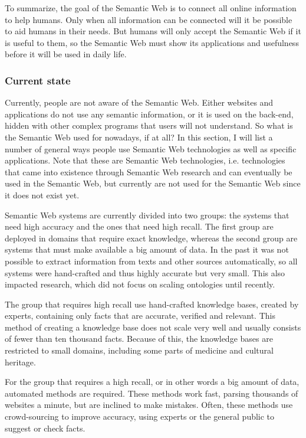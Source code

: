 \documentclass{article}
\begin{document}
 To summarize, the goal of the Semantic Web is to connect all online information to help humans. Only when all information can be connected will it be possible to aid humans in their needs. But humans will only accept the Semantic Web if it is useful to them, so the Semantic Web must show its applications and usefulness before it will be used in daily life.
 \subsubsection{Current state} %
 Currently, people are not aware of the Semantic Web. Either websites and applications do not use any semantic information, or it is used on the back-end, hidden with other complex programs that users will not understand. So what is the Semantic Web used for nowadays, if at all? In this section, I will list a number of general ways people use Semantic Web technologies as well as specific applications. Note that these are Semantic Web technologies, i.e. technologies that came into existence through Semantic Web research and can eventually be used in the Semantic Web, but currently are not used for the Semantic Web since it does not exist yet.
 
 Semantic Web systems are currently divided into two groups: the systems that need high accuracy and the ones that need high recall. The first group are deployed in domains that require exact knowledge, whereas the second group are systems that must make available a big amount of data. In the past it was not possible to extract information from texts and other sources automatically, so all systems were hand-crafted and thus highly accurate but very small. This also impacted research, which did not focus on scaling ontologies until recently.
 
 The group that requires high recall use hand-crafted knowledge bases, created by experts, containing only facts that are accurate, verified and relevant. This method of creating a knowledge base does not scale very well and usually consists of fewer than ten thousand facts. Because of this, the knowledge bases are restricted to small domains, including some parts of medicine and cultural heritage\cite{byrne, le2002}.
 
 For the group that requires a high recall, or in other words a big amount of data, automated methods are required. These methods work fast, parsing thousands of websites a minute, but are inclined to make mistakes. Often, these methods use crowd-sourcing to improve accuracy, using experts or the general public to suggest or check facts\cite{zhou2007}.
 
\end{document}
